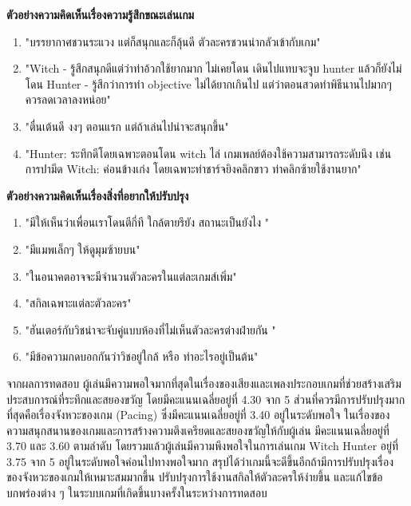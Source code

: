 \pagebreak

\textbf{ตัวอย่างความคิดเห็นเรื่องความรู้สึกขณะเล่นเกม}
\begin{enumerate}
    \item "บรรยากาศชวนระแวง แต่ก็สนุกและก็ลุ้นดี ตัวละครชวนน่ากลัวเข้ากับเกม"
    \item "Witch - รู้สึกสนุกดีแต่ว่าท่าอ้วกใช้ยากมาก ไม่เคยโดน เดินไปแทบจะจูบ hunter แล้วก็ยังไม่โดน
    Hunter - รู้สึกว่าการทำ objective ไม่ได้ยากเกินไป แต่ว่าตอนสวดทำพิธีนานไปมากๆ ควรลดเวลาลงหน่อย"
    \item "ตื่นเต้นดี งงๆ ตอนแรก แต่ถ้าเล่นไปน่าจะสนุกขึ้น"
    \item "Hunter: ระทึกดีโดยเฉพาะตอนโดน witch ไล่ เกมเพลย์ต้องใช้ความสามารถระดับนึง เช่น การปามีด
    Witch: ค่อนข้างเก่ง โดยเฉพาะท่าชาร์จยิงคลิกขาว ท่าคลิกซ้ายใช้งานยาก"
\end{enumerate}

\textbf{ตัวอย่างความคิดเห็นเรื่องสิ่งที่อยากให้ปรับปรุง}
\begin{enumerate}
    \item "มีให้เห็นว่าเพื่อนเราโดนตีกี่ที ใกล้ตายรึยัง สถานะเป็นยังไง "
    \item "มีแมพเล็กๆ  ให้ดูมุมซ้ายบน"
    \item "ในอนาคตอาจจะมีจำนวนตัวละครในแต่ละเกมส์เพิ่ม"
    \item "สกิลเฉพาะแต่ละตัวละคร"
    \item "ฮันเตอร์กับวิชน่าจะจับคู่แบบห้องที่ไม่เห็นตัวละครต่างฝ่ายกัน "
    \item "มีข้อความกดบอกกันว่าวิชอยู่ใกล้ หรือ ทำอะไรอยู่เป็นต้น"
\end{enumerate}

จากผลการทดสอบ ผู้เล่นมีความพอใจมากที่สุดในเรื่องของเสียงและเพลงประกอบเกมที่ช่วยสร้างเสริมประสบการณ์ที่ระทึกและสยองขวัญ
โดยมีคะแนนเฉลี่ยอยู่ที่ 4.30 จาก 5 ส่วนที่ควรมีการปรับปรุงมากที่สุดคือเรื่องจังหวะของเกม (Pacing) 
ซึ่งมีคะแนนเฉลี่ยอยู่ที่ 3.40 อยู่ในระดับพอใจ ในเรื่องของความสนุกสนานของเกมและการสร้างความตึงเครียดและสยองขวัญให้กับผู้เล่น
มีคะแนนเฉลี่ยอยู่ที่ 3.70 และ 3.60 ตามลำดับ โดยรวมแล้วผู้เล่นมีความพึงพอใจในการเล่นเกม Witch Hunter อยู่ที่ 3.75 จาก 5 อยู่ในระดับพอใจค่อนไปทางพอใจมาก
สรุปได้ว่าเกมนี้จะดีขึ้นอีกถ้ามีการปรับปรุงเรื่องของจังหวะของเกมให้เหมาะสมมากขึ้น ปรับปรุงการใช้งานสกิลให้ตัวละครให้ง่ายขึ้น และแก้ไขข้อบกพร่องต่าง
 ๆ ในระบบเกมที่เกิดขึ้นบางครั้งในระหว่างการทดสอบ

